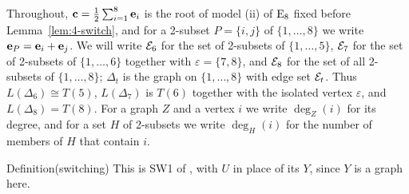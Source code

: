 \medskip
Throughout, ${\mathbf c}=\frac12\sum_{i=1}^8{\mathbf e}_i$ is the root of model (ii) of $\mathrm{E}_8$ fixed before
Lemma~\ref{lem:4-switch}, and for a 2-subset $P=\{i,j\}$ of $\{1,\dots,8\}$ we write
${\mathbf e}_P={\mathbf e}_i+{\mathbf e}_j$. We will write $\mathcal E_6$ for the set of 2-subsets of $\{1,\dots,5\}$,
$\mathcal E_7$ for the set of 2-subsets of $\{1,\dots,6\}$ together with $\varepsilon=\{7,8\}$, and
$\mathcal E_8$ for the set of all 2-subsets of $\{1,\dots,8\}$; $\Delta_t$ is the graph on
$\{1,\dots,8\}$ with edge set $\mathcal E_t$. Thus $L(\Delta_6)\cong T(5)$, $L(\Delta_7)$ is $T(6)$ together
with the isolated vertex $\varepsilon$, and $L(\Delta_8)=T(8)$. For a graph $Z$ and a vertex $i$ we
write $\deg_Z(i)$ for its degree, and for a set $H$ of 2-subsets we write $\deg_H(i)$ for the
number of members of $H$ that contain $i$.

\begin{namedresult}{Definition}{(switching)}\label{def:414-switch}
 \uses{}
 This is SW1 of , with $U$ in place of its $Y$, since $Y$ is a
 graph here.
\end{namedresult}

